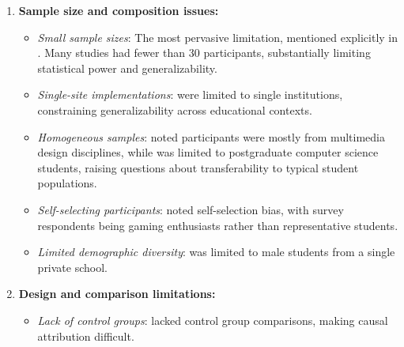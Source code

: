 \documentclass[a4paper,fleqn]{cas-sc}
\begin{document}
\begin{enumerate}[noitemsep]
	\item 
\textbf{Sample size and composition issues:}

\begin{itemize}[noitemsep]
 \item \textit{Small sample sizes}: The most pervasive limitation, mentioned explicitly in \citep{1Barbatsis201159, 2Mahamarowi2023133, 6Czerwinski2018, 11Ternblad2023115, 13Humpire2022, 22Nugroho2020149, 32Cheng20241718, 34Serrano2023, 36Scholz2021, 40Kuran2018, 41Petersen2023301, 49Huizenga2007127, 50Lye2013, 52Lin2011265, 56Akkerman2009449, 62Milosz201896, 72hutauruk2020utilization, 73Wolfartsberger2011160, 77Ramansyah2021, 78Rouse2022357, 79Fernes2024379}. Many studies had fewer than 30 participants, substantially limiting statistical power and generalizability.
 
 \item \textit{Single-site implementations}: \citet{32Cheng20241718, 73Wolfartsberger2011160} were limited to single institutions, constraining generalizability across educational contexts.
 
 \item \textit{Homogeneous samples}: \citet{16Chen201447} noted participants were mostly from multimedia design disciplines, while \citet{6Czerwinski2018} was limited to postgraduate computer science students, raising questions about transferability to typical student populations.
 
 
 \item \textit{Self-selecting participants}: \citet{47Clara2010156} noted self-selection bias, with survey respondents being gaming enthusiasts rather than representative students.
 
 \item \textit{Limited demographic diversity}: \citet{12Gilbert2019108} was limited to male students from a single private school.
\end{itemize}

	\item 
\textbf{Design and comparison limitations:}

\begin{itemize}[noitemsep]
 \item \textit{Lack of control groups}: \citet{14Forsyth2023, 22Nugroho2020149, 32Cheng20241718, 59Kee2014270, 75trajano2014using, 78Rouse2022357} lacked control group comparisons, making causal attribution difficult.
 

\end{itemize}
\end{enumerate}
\end{document}
